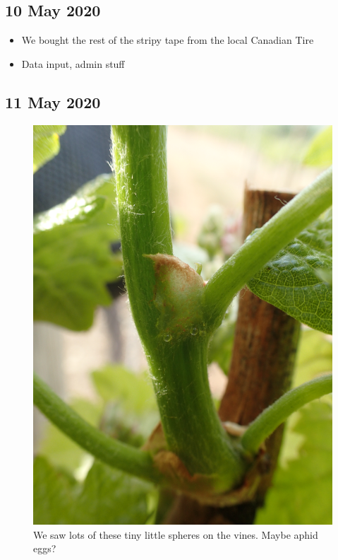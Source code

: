 \documentclass[11pt,letter]{article}
\newenvironment{smitemize}{
\begin{itemize}
  \setlength{\itemsep}{0pt}
  \setlength{\parskip}{0.8pt}
  \setlength{\parsep}{0pt}}
{\end{itemize}
}
\begin{document}
\subsection {10 May 2020}
\begin{smitemize}
\item We bought the rest of the stripy tape from the local Canadian Tire
\item Data input, admin stuff
\end{smitemize}

\subsection {11 May 2020}
\begin{figure}%
  \includegraphics[width=\linewidth]{TinnyEggBalls.jpg}
  \caption{We saw lots of these tiny little spheres on the vines. Maybe aphid eggs?}
  \label{fig:tinyEggBalls}
\end{figure}
\end{document}
